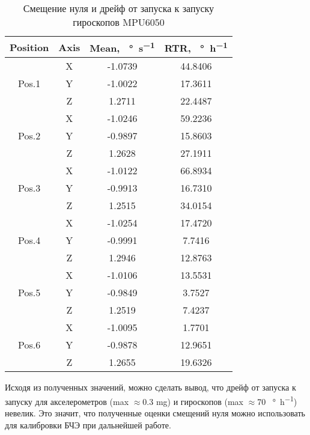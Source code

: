 \begin{table}[h!]
	\centering
	\caption{Смещение нуля и дрейф от запуска к запуску гироскопов MPU6050}
	\begin{tabular}{|c|c|c|c|}
	\hline
	Position & Axis & Mean, \SI[per-mode=symbol]{}{\degree\per\second} & RTR, \SI[per-mode=symbol]{}{\degree\per\hour} \\ \hline
	\multirow{3}{*}{Pos.1}	& X & -1.0739 & 44.8406 \\												 
							\cline{2-4}
							& Y & -1.0022 & 17.3611 \\												 
							\cline{2-4}
							& Z & 1.2711 & 22.4487 \\												 
	\hline
	\multirow{3}{*}{Pos.2}	& X & -1.0246 & 59.2236 \\												 
							\cline{2-4}
							& Y & -0.9897 & 15.8603 \\												 
							\cline{2-4}
							& Z & 1.2628 & 27.1911 \\												 
	\hline	
	\multirow{3}{*}{Pos.3}	& X & -1.0122 & 66.8934 \\												 
							\cline{2-4}
							& Y & -0.9913 & 16.7310 \\												 
							\cline{2-4}
							& Z & 1.2515 & 34.0154 \\												 
	\hline
	\multirow{3}{*}{Pos.4}	& X & -1.0254 & 17.4720 \\												 
							\cline{2-4}
							& Y & -0.9991 & 7.7416 \\												 
							\cline{2-4}
							& Z & 1.2946 & 12.8763 \\												 
	\hline
	\multirow{3}{*}{Pos.5}	& X & -1.0106 & 13.5531 \\												 
							\cline{2-4}
							& Y & -0.9849 & 3.7527 \\												 
							\cline{2-4}
							& Z & 1.2519 & 7.4237 \\												 
	\hline
	\multirow{3}{*}{Pos.6}	& X & -1.0095 & 1.7701 \\												 
							\cline{2-4}
							& Y & -0.9878 & 12.9651 \\												 
							\cline{2-4}
							& Z & 1.2655 & 19.6326 \\												 
	\hline
	\end{tabular}
	\label{table:gyr_rtr}
\end{table}

Исходя из полученных значений, можно сделать вывод, что дрейф от запуска к запуску для акселерометров (max $\approx$0.3 mg) и гироскопов (max $\approx$70 \SI[per-mode=symbol]{}{\degree\per\hour}) невелик.
Это значит, что полученные оценки смещений нуля можно использовать для калибровки БЧЭ при дальнейшей работе.

